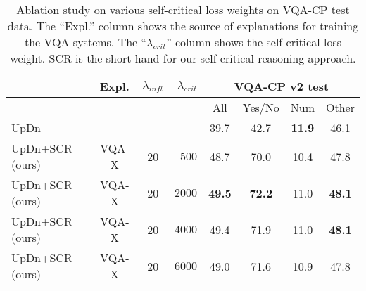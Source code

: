 \documentclass{article}
\begin{document}
\begin{table*}[!t]
\centering
\begin{tabular}{l|c|cr|cccc}
\hline \toprule
                    & Expl. & $\mathcal{\lambda}_{infl}$ & $\mathcal{\lambda}_{crit}$ & \multicolumn{4}{c}{VQA-CP v2 test}\\    \hline
                    &       &  &  & All     & Yes/No &  Num  & Other \\ \hline\hline
UpDn    \cite{anderson2017bottom}            &       &  &  & 39.7   &  42.7  & \textbf{11.9}  & 46.1  \\ \hline
UpDn+SCR (ours)   &  VQA-X  & 20 & $500$ & 48.7   &  70.0  & 10.4  & 47.8  \\
UpDn+SCR (ours)   &  VQA-X  & 20 & $2000$ & \textbf{49.5}   &  \textbf{72.2}  & 11.0  & \textbf{48.1}  \\
UpDn+SCR (ours)   &  VQA-X  & 20 & $4000$ & 49.4   &  71.9  & 11.0  & \textbf{48.1}  \\ 
UpDn+SCR (ours)   &  VQA-X  & 20 & $6000$ & 49.0   &  71.6  & 10.9  & 47.8  \\ \bottomrule
\end{tabular}
\caption{Ablation study on various self-critical loss weights on VQA-CP test data.  The ``Expl.'' column shows the source of explanations for training the VQA systems. The ``$\mathcal{\lambda}_{crit}$'' column shows the self-critical loss weight. SCR is the short hand for our self-critical reasoning approach.}
\label{tab:crit_ablation}
\end{table*}
\end{document}
